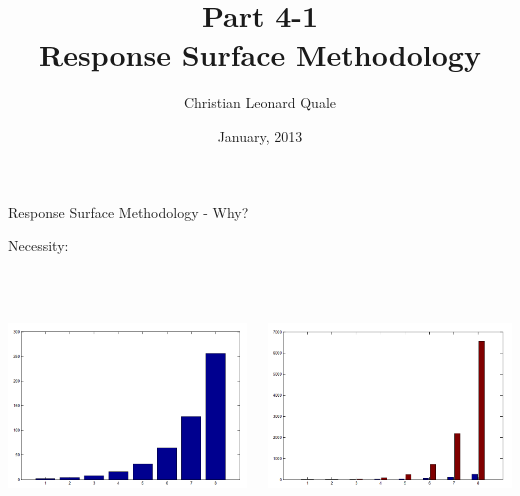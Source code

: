 \documentclass[14pt]{beamer}
\title[EPDM Presentation]{Part 4-1 \\ Response Surface Methodology}
\author[C. L. Quale]{Christian Leonard Quale}
\institute{
  University of Edinburgh
}
\date[January 2013]{January, 2013}
\begin{document}
\begin{frame}[plain]
  \titlepage
\end{frame}



\begin{frame}{Response Surface Methodology - Why?}

Necessity: \\
\pause
\ \\
\ \\
\begin{columns}
    \begin{column}{0.5\textwidth}
      \centering
      \includegraphics[width=1.1\textwidth]{2levels.png}
    \end{column}
    \pause
    \begin{column}{0.5\textwidth}
      \centering
      \includegraphics[width=1.1\textwidth]{3levels.png}
    \end{column}
  \end{columns}

\end{frame}
\end{document}
